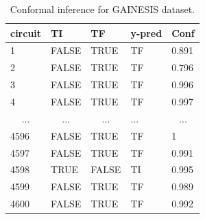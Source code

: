 \begin{table}[t]
\centering
\caption{Conformal inference for GAINESIS dataset.}
\begin{tabular}{lllll}
\hline
\textbf{circuit}        & \textbf{TI}             & \textbf{TF}             & \textbf{y-pred} & \textbf{Conf}           \\ \hline
1                       & FALSE                   & TRUE                    & TF              & 0.891                   \\ \hline
2                       & FALSE                   & TRUE                    & TF              & 0.796                   \\ \hline
3                       & FALSE                   & TRUE                    & TF              & 0.996                   \\ \hline
4                       & FALSE                   & TRUE                    & TF              & 0.997                   \\ \hline
\multicolumn{1}{c}{...} & \multicolumn{1}{c}{...} & \multicolumn{1}{c}{...} & ...             & \multicolumn{1}{c}{...} \\ \hline
4596                    & FALSE                   & TRUE                    & TF              & 1                       \\ \hline
4597                    & FALSE                   & TRUE                    & TF              & 0.991                   \\ \hline
4598                    & TRUE                    & FALSE                   & TI              & 0.995                   \\ \hline
4599                    & FALSE                   & TRUE                    & TF              & 0.989                   \\ \hline
4600                    & FALSE                   & TRUE                    & TF              & 0.992                   \\ \hline
\end{tabular}
\label{tab:binary_cp}
\end{table}

